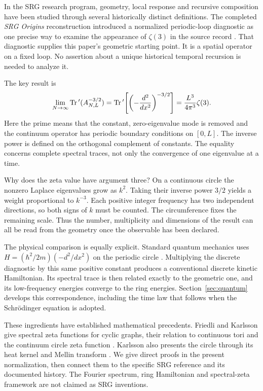 \documentclass[11pt,a4paper]{article}
\theoremstyle{definition}\newtheorem{definition}[theorem]{Definition}
\theoremstyle{remark}\newtheorem{remark}[theorem]{Remark}
\newcommand{\Tr}{\operatorname{Tr}}
\numberwithin{equation}{section}
\begin{document}
In the SRG research program, geometry, local response and recursive
composition have been studied through several historically distinct
definitions. The completed \emph{SRG Origins} reconstruction introduced a
normalized periodic-loop diagnostic as one precise way to examine the
appearance of \(\zeta(3)\) in the source record
\cite[section 5]{origins}. That diagnostic supplies this paper's geometric
starting point. It is a spatial operator on a fixed loop. No assertion about
a unique historical temporal recursion is needed to analyze it.

The key result is
\begin{equation}
 \lim_{N\to\infty}\Tr{}'(\AN^{-3/2})
   =\Tr{}'\!\left[\left(-\frac{d^2}{dx^2}\right)^{-3/2}\right]
   =\frac{L^3}{4\pi^3}\zeta(3).
 \label{eq:headline}
\end{equation}
Here the prime means that the constant, zero-eigenvalue mode is removed and
the continuum operator has periodic boundary conditions on \([0,L]\).
The inverse power is defined on the orthogonal complement of constants.
The equality concerns complete spectral traces, not only the convergence of
one eigenvalue at a time.

Why does the zeta value have argument three? On a continuous circle the
nonzero Laplace eigenvalues grow as \(k^2\). Taking their inverse power
\(3/2\) yields a weight proportional to \(k^{-3}\). Each positive integer
frequency has two independent directions, so both signs of \(k\) must be
counted. The circumference fixes the remaining scale. Thus the number,
multiplicity and dimensions of the result can all be read from the geometry
once the observable has been declared.

The physical comparison is equally explicit. Standard quantum mechanics
uses \(H=(\hbar^2/2m)(-d^2/dx^2)\) on the periodic circle
\cite{zwiebach}. Multiplying the discrete diagnostic by this same positive
constant produces a conventional discrete kinetic Hamiltonian. Its spectral
trace is then related exactly to the geometric one, and its low-frequency
energies converge to the ring energies. Section~\ref{sec:quantum} develops
this correspondence, including the time law that follows when the
Schr\"odinger equation is adopted.

These ingredients have established mathematical precedents. Friedli and
Karlsson give spectral zeta functions for cyclic graphs, their relation to
continuous tori and the continuum circle zeta function
\cite[pp.~2--3, Eqs.~(1)--(2)]{friedli}.
Karlsson also presents the circle through its heat kernel and Mellin
transform \cite[section 2.1]{karlsson}.
We give direct proofs in the present normalization, then connect them to the
specific SRG reference and its documented history.
The Fourier spectrum, ring Hamiltonian and spectral-zeta framework are not
claimed as SRG inventions.
\end{document}
